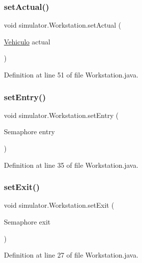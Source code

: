 \subsubsection{\texorpdfstring{set\+Actual()}{setActual()}}
{\footnotesize\ttfamily void simulator.\+Workstation.\+set\+Actual (\begin{DoxyParamCaption}\item[{\mbox{\hyperlink{classsimulator_1_1_vehiculo}{Vehiculo}}}]{actual }\end{DoxyParamCaption})}



Definition at line 51 of file Workstation.\+java.

\mbox{\label{classsimulator_1_1_workstation_a1addeff99cf0ca9aaa020fe328a4f3fd}} 
\subsubsection{\texorpdfstring{set\+Entry()}{setEntry()}}
{\footnotesize\ttfamily void simulator.\+Workstation.\+set\+Entry (\begin{DoxyParamCaption}\item[{Semaphore}]{entry }\end{DoxyParamCaption})}



Definition at line 35 of file Workstation.\+java.

\mbox{\label{classsimulator_1_1_workstation_a8807fa5c10a39810306359971abd58f0}} 
\subsubsection{\texorpdfstring{set\+Exit()}{setExit()}}
{\footnotesize\ttfamily void simulator.\+Workstation.\+set\+Exit (\begin{DoxyParamCaption}\item[{Semaphore}]{exit }\end{DoxyParamCaption})}



Definition at line 27 of file Workstation.\+java.

